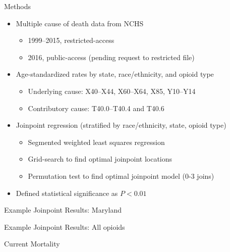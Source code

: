 \documentclass[ignorenonframetext,compress]{beamer}
\providecommand{\tightlist}{%
  \setlength{\itemsep}{0pt}\setlength{\parskip}{0pt}}
\begin{document}
\begin{frame}{Methods}

\begin{itemize}[<+->]
\tightlist
\item
  Multiple cause of death data from NCHS

  \begin{itemize}[<+->]
  \tightlist
  \item
    1999--2015, restricted-access
  \item
    2016, public-access (pending request to restricted file)
  \end{itemize}
\item
  Age-standardized rates by state, race/ethnicity, and opioid type

  \begin{itemize}[<+->]
  \tightlist
  \item
    Underlying cause: X40--X44, X60--X64, X85, Y10--Y14
  \item
    Contributory cause: T40.0--T40.4 and T40.6
  \end{itemize}
\item
  Joinpoint regression (stratified by race/ethnicity, state, opioid
  type)

  \begin{itemize}[<+->]
  \tightlist
  \item
    Segmented weighted least squares regression
  \item
    Grid-search to find optimal joinpoint locations
  \item
    Permutation test to find optimal joinpoint model (0-3 joins)
  \end{itemize}
\item
  Defined statistical significance as \(P < 0.01\)
\end{itemize}

\end{frame}

\begin{frame}{Example Joinpoint Results: Maryland}

\end{frame}

\begin{frame}{Example Joinpoint Results: All opioids}

\end{frame}

\begin{frame}{Current Mortality}

\end{frame}
\end{document}
